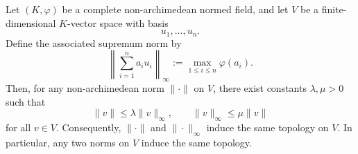 \begin{theorem}
    Let \((K,\varphi)\) be a complete non-archimedean normed field, and let
    \(V\) be a finite-dimensional \(K\)-vector space with basis
    \[
        u_1,\dots,u_n.
    \]
    Define the associated supremum norm by
    \[
        \left\|\sum_{i=1}^{n} a_i u_i\right\|_{\infty}
        :=
        \max_{1\leq i\leq n}\varphi(a_i).
    \]
    Then, for any non-archimedean norm \(\|\cdot\|\) on \(V\), there exist constants
    \(\lambda,\mu>0\) such that
    \[
        \|v\|\leq \lambda \|v\|_{\infty},
        \qquad
        \|v\|_{\infty}\leq \mu \|v\|
    \]
    for all \(v\in V\). Consequently, \(\|\cdot\|\) and \(\|\cdot\|_{\infty}\) induce the same
    topology on \(V\). In particular, any two norms on \(V\) induce the same topology.
\end{theorem}

